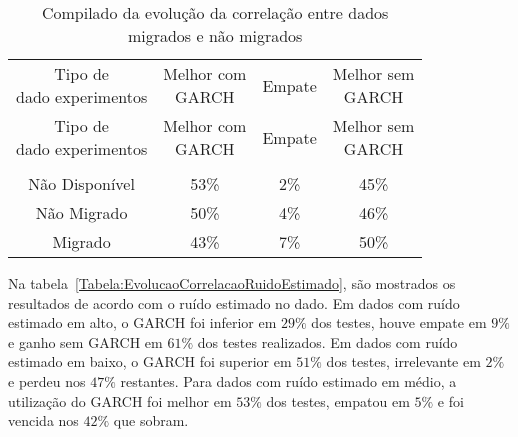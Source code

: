 \begin{center}
\begin{longtable}{cccc}
\toprule
\rowcolor{white}
 \caption{Compilado da evolução da correlação entre dados migrados e não
 migrados} \label{Tabela:EvolucaoCorrelacaoMigradoNaoMigrado} \\
\midrule
\rowcolor{white}
   \specialcell{Tipo de\\dado experimentos} & \specialcell{Melhor com\\GARCH} &
   Empate & \specialcell{Melhor sem\\GARCH} \\
\midrule
\endfirsthead
\midrule
\rowcolor{white}
   \specialcell{Tipo de\\dado experimentos} & \specialcell{Melhor com\\GARCH} &
   Empate & \specialcell{Melhor sem\\GARCH} \\
\toprule
\endhead
\midrule \\ %
\endfoot
\bottomrule
\endlastfoot
    Não Disponível & 53\%  & 2\%   & 45\% \\
    Não Migrado & 50\%  & 4\%   & 46\% \\
    Migrado & 43\%  & 7\%   & 50\% \\
\end{longtable}
\end{center}

Na tabela~\ref{Tabela:EvolucaoCorrelacaoRuidoEstimado}, são mostrados os resultados
de acordo com o ruído estimado no dado. Em dados com ruído estimado em alto, o
GARCH foi inferior em $29\%$ dos testes, houve empate em $9\%$ e ganho sem GARCH
em $61\%$ dos testes realizados. Em dados com ruído estimado em baixo, o GARCH
foi superior em $51\%$ dos testes, irrelevante em $2\%$ e perdeu nos $47\%$
restantes. Para dados com ruído estimado em médio, a utilização do GARCH
foi melhor em $53\%$ dos testes, empatou em $5\%$ e foi vencida nos $42\%$ que
sobram.

